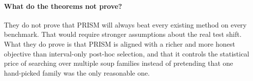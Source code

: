 \documentclass{article}
\newcommand{\prism}{\textup{\textsc{PRISM}}}
\newcommand{\1}{\mathbbm{1}}
\begin{document}
\paragraph{What do the theorems not prove?}
They do not prove that \prism{} will always beat every existing method on every benchmark. That would require stronger assumptions about the real test shift. What they do prove is that \prism{} is aligned with a richer and more honest objective than interval-only post-hoc selection, and that it controls the statistical price of searching over multiple soup families instead of pretending that one hand-picked family was the only reasonable one.
\end{document}

